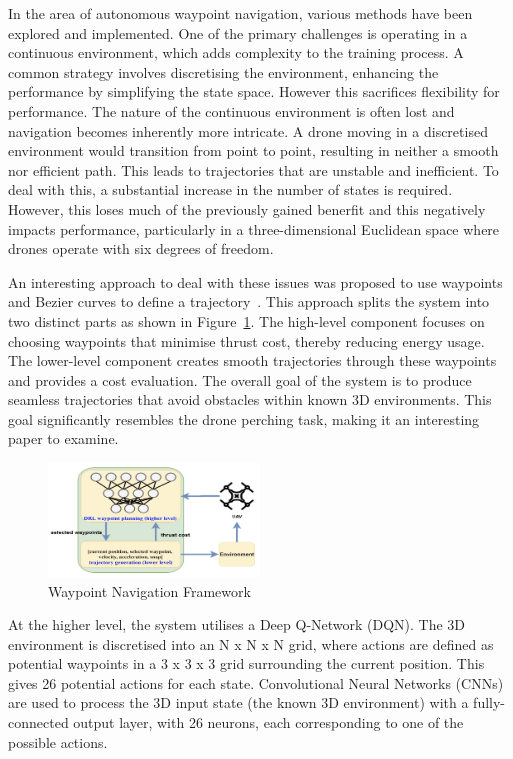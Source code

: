 
In the area of autonomous waypoint navigation, various methods have been explored and implemented.
One of the primary challenges is operating in a continuous environment, which adds complexity to the training process.
A common strategy involves discretising the environment, enhancing the performance by simplifying the state space.
However this sacrifices flexibility for performance.
The nature of the continuous environment is often lost and navigation becomes inherently more intricate.
A drone moving in a discretised environment would transition from point to point, resulting in neither a smooth nor efficient path.
This leads to trajectories that are unstable and inefficient.
To deal with this, a substantial increase in the number of states is required.
However, this loses much of the previously gained benerfit and this negatively impacts performance, particularly in a three-dimensional Euclidean space where drones operate with six degrees of freedom.

An interesting approach to deal with these issues was proposed to use waypoints and Bezier curves to define a trajectory~\cite{fyp12-waypoint-navigation}.
This approach splits the system into two distinct parts as shown in Figure~\ref{fig:fyp12-waypoint-nav-framework}.
The high-level component focuses on choosing waypoints that minimise thrust cost, thereby reducing energy usage.
The lower-level component creates smooth trajectories through these waypoints and provides a cost evaluation.
The overall goal of the system is to produce seamless trajectories that avoid obstacles within known 3D environments.
This goal significantly resembles the drone perching task, making it an interesting paper to examine.

\begin{figure}[htbp]
  \centering
  \includegraphics[width=0.5\textwidth]{background/fyp12-waypoint-nav-framework.png}
  \caption{Waypoint Navigation Framework}
\label{fig:fyp12-waypoint-nav-framework}
\end{figure}

At the higher level, the system utilises a Deep Q-Network (DQN).
The 3D environment is discretised into an N x N x N grid, where actions are defined as potential waypoints in a 3 x 3 x 3 grid surrounding the current position.
This gives 26 potential actions for each state.
Convolutional Neural Networks (CNNs) are used to process the 3D input state (the known 3D environment) with a fully-connected output layer, with 26 neurons, each corresponding to one of the possible actions.

